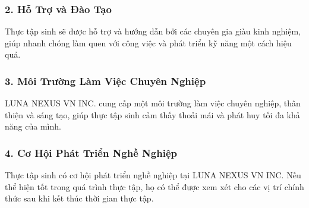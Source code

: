 \begin{flushleft}
		\subsubsection*{2. Hỗ Trợ và Đào Tạo}
		\fontsize{14}{20}\selectfont Thực tập sinh sẽ được hỗ trợ và hướng dẫn bởi các chuyên gia giàu kinh nghiệm, giúp nhanh chóng làm quen với công việc và phát triển kỹ năng một cách hiệu quả.

		\subsubsection*{3. Môi Trường Làm Việc Chuyên Nghiệp}
		\fontsize{14}{20}\selectfont LUNA NEXUS VN INC. cung cấp một môi trường làm việc chuyên nghiệp, thân thiện và sáng tạo, giúp thực tập sinh cảm thấy thoải mái và phát huy tối đa khả năng của mình.

		\subsubsection*{4. Cơ Hội Phát Triển Nghề Nghiệp}
		\fontsize{14}{20}\selectfont Thực tập sinh có cơ hội phát triển nghề nghiệp tại LUNA NEXUS VN INC. Nếu thể hiện tốt trong quá trình thực tập, họ có thể được xem xét cho các vị trí chính thức sau khi kết thúc thời gian thực tập.
	\end{flushleft}
		\pagebreak